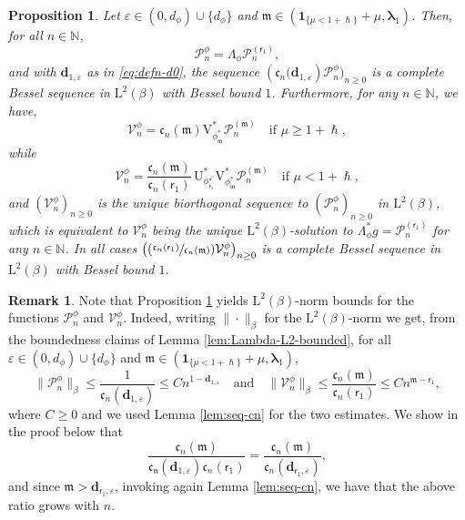 \documentclass[10pt]{amsart}
\let\epsilon\varepsilon
\newcommand{\Psfrac}[2]{(\sfrac{#1}{#2})}
\theoremstyle{plain}
\newtheorem{proposition}[theorem]{Proposition}
\theoremstyle{definition}
\newtheorem{remark}[theorem]{Remark}
\newcommand{\N}{\mathbb{N}}
\renewcommand{\P}{\mathcal{P}}
\newcommand{\V}{\mathcal{V}}
\newcommand{\Leb}{\mathrm{L}}
\newcommand{\m}{\mathfrak{m}}
\newcommand{\dpt}{\bm{d}_{\vat,\epsilon}}
\newcommand{\dz}{{\bm{d}}_{1,\epsilon}}
\newcommand{\lam}{{\bm{\lambda}_1}}
\newcommand{\vat}{{\mathsf{r}_1}}
\newcommand{\phm}{{\phi_\m^*}}
\renewcommand{\varphi}{{\phi_{\vat}^{\checkmark}}}
\let\h\hslash
\let\mo\mu
\let\bpsi\beta
\begin{document}
\begin{proposition}
\label{prop:riesz}
Let $\epsilon \in (0,d_\phi) \cup \{d_\phi\}$ and $\m \in (\bm{1}_{\{\mo < 1+\h\}} + \mo ,\lam)$. Then,
for all $n \in \N$,
\begin{equation}
\label{eq:alt-V-n-0}
\P_n^\phi = \Lambda_{\phi} \P_n^{(\vat)},
\end{equation}
and with $\dz$ as in \eqref{eq:defn-d0}, the sequence $\left(\mathfrak{c}_n(\dz\right)\P_n^\phi)_{n \geq 0}$ is a complete Bessel sequence in $\Leb^2(\bpsi)$ with Bessel bound $1$. Furthermore, for any $n \in \N$, we have,
\begin{equation}
\label{eq:alt-V-n}
\V_n^\phi = \mathfrak{c}_n(\m) \mathrm{V}_{\phm}^*\P_n^{(\m)} \quad \mbox{if } \mo \geq 1+\h,
\end{equation}
while
\begin{equation*}
\V_n^\phi = \frac{\mathfrak{c}_n(\m)}{\mathfrak{c}_n(\vat)}\, {\mathrm{U}}_\varphi^* \mathrm{V}_{\phm}^*\P_n^{(\m)}
\quad \mbox{if } \mo < 1+\h,
\end{equation*}
and $(\V_n^\phi)_{n \geq 0}$ is the unique biorthogonal sequence to $(\P_n^\phi)_{n \geq 0}$ in $\Leb^2(\bpsi)$, which is equivalent to $\V_n^\phi$ being the unique $\Leb^2(\bpsi)$-solution to $\Lambda_\phi^* g = \P_n^{(\vat)}$ for any $n \in \N$. In all cases $\bigl(\Psfrac{\mathfrak{c}_n(\vat)}{\mathfrak{c}_n(\m)} \V_n^\phi\bigr)_{n \geq 0}$ is a complete Bessel sequence in $\Leb^2(\bpsi)$ with Bessel bound $1$.
\end{proposition}
\begin{remark}\label{rem:bounds}
Note that Proposition \ref{prop:riesz} yields $\Leb^2(\bpsi)$-norm bounds for the functions $\P_n^\phi$ and $\V_n^\phi$. Indeed, writing $\|{\cdot}\|_\bpsi$ for the $\Leb^2(\bpsi)$-norm we get, from the boundedness claims of Lemma \ref{lem:Lambda-L2-bounded}, for all $\epsilon \in (0,d_\phi) \cup \{d_\phi\}$ and $\m \in (\bm{1}_{\{\mo < 1+\h\}} + \mo,\lam)$,
\begin{equation*}
\|\P_n^\phi\|_\bpsi \leq \frac{1}{\mathfrak{c}_n(\dz)}\leq C n^{1-\dz} \quad \text{and} \quad \|\V_n^\phi\|_\bpsi \leq \frac{\mathfrak{c}_n(\m)}{\mathfrak{c}_n(\vat)}\leq C n^{\m-\vat},
\end{equation*}
where $C \ge 0$ and we used Lemma \ref{lem:seq-cn} for the two estimates.
We show in the proof below that
\begin{equation*}
\frac{\mathfrak{c}_n(\m)}{\mathfrak{c_n}(\dz)\mathfrak{c}_n(\vat)} = \frac{\mathfrak{c}_n(\m)}{\mathfrak{c}_n(\dpt)},
\end{equation*}
and since $\m > \dpt$, invoking again Lemma \ref{lem:seq-cn}, we have that the above ratio grows with $n$.
\end{remark}
\end{document}
